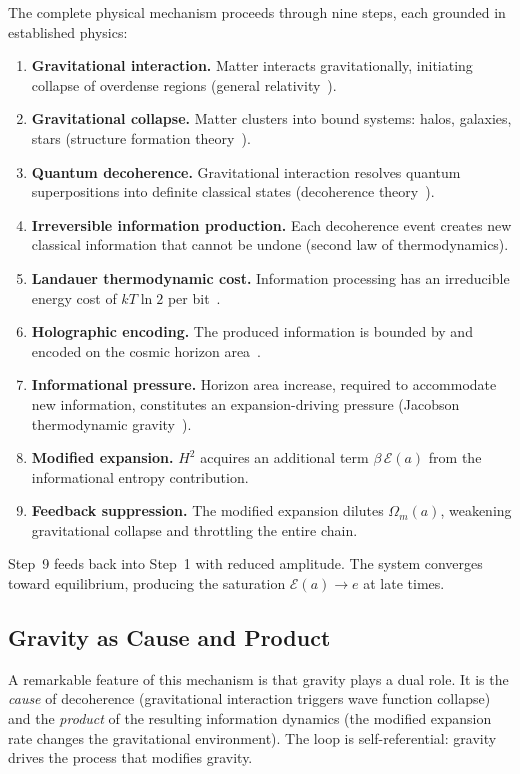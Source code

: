 \documentclass[11pt]{article}
\begin{document}
The complete physical mechanism proceeds through nine steps, each grounded
in established physics:
\begin{enumerate}
\item \textbf{Gravitational interaction.} Matter interacts gravitationally,
  initiating collapse of overdense regions (general
  relativity~\citep{Einstein1915}).
\item \textbf{Gravitational collapse.} Matter clusters into bound systems:
  halos, galaxies, stars (structure formation theory~\citep{Peebles1980}).
\item \textbf{Quantum decoherence.} Gravitational interaction resolves
  quantum superpositions into definite classical states (decoherence
  theory~\citep{Zurek2003}).
\item \textbf{Irreversible information production.} Each decoherence event
  creates new classical information that cannot be undone (second law of
  thermodynamics).
\item \textbf{Landauer thermodynamic cost.} Information processing has an
  irreducible energy cost of $kT\ln 2$ per
  bit~\citep{Landauer1961}.
\item \textbf{Holographic encoding.} The produced information is bounded by
  and encoded on the cosmic horizon
  area~\citep{Bekenstein1973,tHooft1993,Susskind1995}.
\item \textbf{Informational pressure.} Horizon area increase, required to
  accommodate new information, constitutes an expansion-driving pressure
  (Jacobson thermodynamic gravity~\citep{Jacobson1995}).
\item \textbf{Modified expansion.} $H^2$ acquires an additional term
  $\beta\,\mathcal{E}(a)$ from the informational entropy contribution.
\item \textbf{Feedback suppression.} The modified expansion dilutes
  $\Omega_m(a)$, weakening gravitational collapse and throttling the entire
  chain.
\end{enumerate}
Step~9 feeds back into Step~1 with reduced amplitude.  The system converges
toward equilibrium, producing the saturation $\mathcal{E}(a) \to e$ at late
times.

\subsection{Gravity as Cause and Product}

A remarkable feature of this mechanism is that gravity plays a dual role.  It
is the \textit{cause} of decoherence (gravitational interaction triggers wave
function collapse) and the \textit{product} of the resulting information
dynamics (the modified expansion rate changes the gravitational environment).
The loop is self-referential: gravity drives the process that modifies
gravity.
\end{document}
